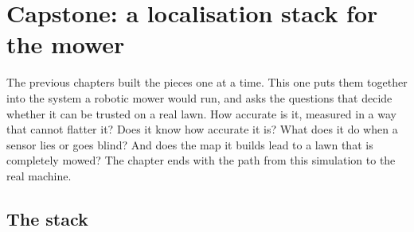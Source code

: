 \chapter{Capstone: a localisation stack for the mower}
\label{ch:capstone}

The previous chapters built the pieces one at a time. This one puts them
together into the system a robotic mower would run, and asks the
questions that decide whether it can be trusted on a real lawn. How
accurate is it, measured in a way that cannot flatter it? Does it know
how accurate it is? What does it do when a sensor lies or goes blind?
And does the map it builds lead to a lawn that is completely mowed? The
chapter ends with the path from this simulation to the real machine.

\section{The stack}

